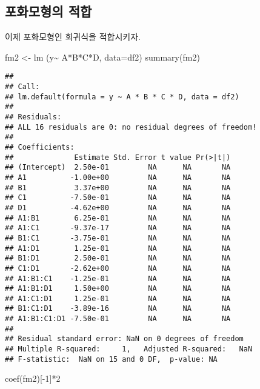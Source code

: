 \documentclass[
]{book}
\newenvironment{Shaded}{\begin{snugshade}}{\end{snugshade}}
\newcommand{\AttributeTok}[1]{\textcolor[rgb]{0.77,0.63,0.00}{#1}}
\newcommand{\DecValTok}[1]{\textcolor[rgb]{0.00,0.00,0.81}{#1}}
\newcommand{\FunctionTok}[1]{\textcolor[rgb]{0.00,0.00,0.00}{#1}}
\newcommand{\NormalTok}[1]{#1}
\newcommand{\OtherTok}[1]{\textcolor[rgb]{0.56,0.35,0.01}{#1}}
\newcommand{\SpecialCharTok}[1]{\textcolor[rgb]{0.00,0.00,0.00}{#1}}
\begin{document}
\hypertarget{uxd3ecuxd654uxbaa8uxd615uxc758-uxc801uxd569}{%
\subsection{포화모형의 적합}\label{uxd3ecuxd654uxbaa8uxd615uxc758-uxc801uxd569}}

이제 포화모형인 회귀식을 적합시키자.

\begin{Shaded}
\begin{Highlighting}[]
\NormalTok{fm2 }\OtherTok{\textless{}{-}} \FunctionTok{lm}\NormalTok{ (y}\SpecialCharTok{\textasciitilde{}}\NormalTok{ A}\SpecialCharTok{*}\NormalTok{B}\SpecialCharTok{*}\NormalTok{C}\SpecialCharTok{*}\NormalTok{D, }\AttributeTok{data=}\NormalTok{df2) }
\FunctionTok{summary}\NormalTok{(fm2)}
\end{Highlighting}
\end{Shaded}

\begin{verbatim}
## 
## Call:
## lm.default(formula = y ~ A * B * C * D, data = df2)
## 
## Residuals:
## ALL 16 residuals are 0: no residual degrees of freedom!
## 
## Coefficients:
##              Estimate Std. Error t value Pr(>|t|)
## (Intercept)  2.50e-01         NA      NA       NA
## A1          -1.00e+00         NA      NA       NA
## B1           3.37e+00         NA      NA       NA
## C1          -7.50e-01         NA      NA       NA
## D1          -4.62e+00         NA      NA       NA
## A1:B1        6.25e-01         NA      NA       NA
## A1:C1       -9.37e-17         NA      NA       NA
## B1:C1       -3.75e-01         NA      NA       NA
## A1:D1        1.25e-01         NA      NA       NA
## B1:D1        2.50e-01         NA      NA       NA
## C1:D1       -2.62e+00         NA      NA       NA
## A1:B1:C1    -1.25e-01         NA      NA       NA
## A1:B1:D1     1.50e+00         NA      NA       NA
## A1:C1:D1     1.25e-01         NA      NA       NA
## B1:C1:D1    -3.89e-16         NA      NA       NA
## A1:B1:C1:D1 -7.50e-01         NA      NA       NA
## 
## Residual standard error: NaN on 0 degrees of freedom
## Multiple R-squared:     1,   Adjusted R-squared:   NaN 
## F-statistic:  NaN on 15 and 0 DF,  p-value: NA
\end{verbatim}

\begin{Shaded}
\begin{Highlighting}[]
\FunctionTok{coef}\NormalTok{(fm2)[}\SpecialCharTok{{-}}\DecValTok{1}\NormalTok{]}\SpecialCharTok{*}\DecValTok{2}
\end{Highlighting}
\end{Shaded}
\end{document}
